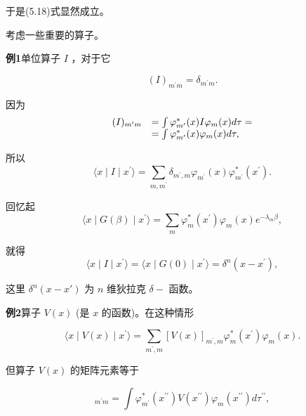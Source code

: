 于是(5.18)式显然成立。

考虑一些重要的算子。

\textbf{例1}\quad 单位算子 $I$ ，对于它

\begin{equation*}
(I) _ {m ^ {\prime} m} = \delta_ {m ^ {\prime} m}.
\end{equation*}

因为
\begin{equation*}
\begin{array}{r l} (I) _ {m ^ {\prime} m} & = \int \varphi_ {m ^ {\prime}} ^ {*} (x) I \varphi_ {m} (x) d \tau = \\ & = \int \varphi_ {m ^ {\prime}} ^ {*} (x) \varphi_ {m} (x) d \tau , \end{array}
\end{equation*}

所以
\begin{equation*}
\langle x \mid I \mid x ^ {\prime} \rangle = \sum_ {m, m ^ {\prime}} \delta_ {m ^ {\prime}, m} \varphi_ {m ^ {\prime}} (x) \varphi_ {m ^ {\prime}} ^ {*} (x ^ {\prime}).
\end{equation*}

回忆起
\begin{equation*}
\langle x \mid G (\beta) \mid x ^ {\prime} \rangle = \sum_ {m} \varphi_ {m} ^ {*} (x ^ {\prime}) \varphi_ {m} (x) e ^ {- \lambda_ {m} \beta},
\end{equation*}

就得
\begin{equation*}
\langle x \mid I \mid x ^ {\prime} \rangle = \langle x \mid G (0) \mid x ^ {\prime} \rangle = \delta^ {n} (x - x ^ {\prime}),
\end{equation*}

这里 $\delta^{n}(x-x')$ 为 $n$ 维狄拉克 $\delta-$ 函数。

\textbf{例2}\quad 算子 $V(x)$ (是 $x$ 的函数)。在这种情形

\begin{equation*}
\langle x \mid V (x) \mid x ^ {\prime} \rangle = \sum_ {m ^ {\prime}, m} [ V (x) ] _ {m ^ {\prime}, m} \varphi_ {m} ^ {*} (x ^ {\prime}) \varphi_ {m} (x).
\end{equation*}

但算子 $V(x)$ 的矩阵元素等于

\begin{equation*}
[ V (x) ] _ {m ^ {\prime} m} = \int \varphi_ {m ^ {\prime}} ^ {*} (x ^ {\prime \prime}) V (x ^ {\prime \prime}) \varphi_ {m} (x ^ {\prime \prime}) d \tau^ {\prime \prime},
\end{equation*}

